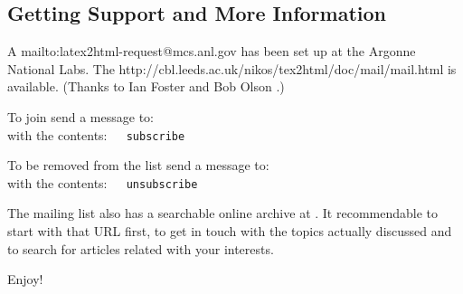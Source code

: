 \subsection[center]{Getting Support and More Information\label{support}}%
%

A %
{mailto:latex2html-request@mcs.anl.gov}
has been set up at the Argonne National Labs.
The %
{http://cbl.leeds.ac.uk/nikos/tex2html/doc/mail/mail.html} is available.
\html{\\}
(Thanks to Ian Foster 
and Bob Olson .)

\smallskip\noindent
To join send a message to: 
\\
with the contents:~~\texttt{ subscribe }


\smallskip\noindent
To be removed from the list send a message to:
\\
with the contents:~~\texttt{ unsubscribe }


\bigskip\noindent
The mailing list also has a searchable online archive at \ListURL.
It recommendable to start with that URL first, to get in touch with
the topics actually discussed and to search for articles related with
your interests.

\bigskip
Enjoy!

